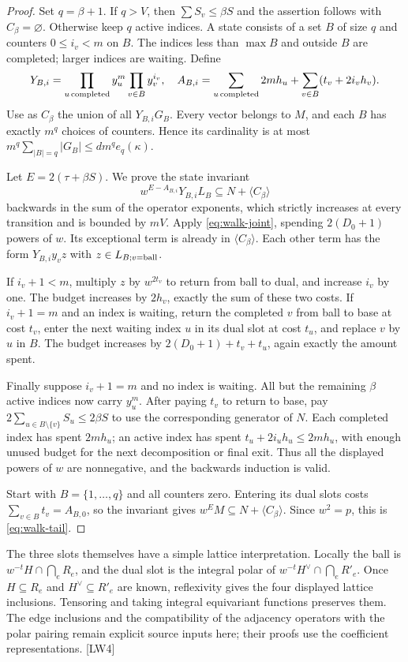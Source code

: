 \begin{proof}
Set $q=\beta+1$. If $q>V$, then $\sum S_v\le\beta S$ and the assertion follows with $C_\beta=\varnothing$. Otherwise keep $q$ active indices. A state consists of a set $B$ of size $q$ and counters $0\le i_v<m$ on $B$. The indices less than $\max B$ and outside $B$ are completed; larger indices are waiting. Define
\[
 Y_{B,i}=\prod_{u\,\rm completed}y_u^m\prod_{v\in B}y_v^{i_v},
 \quad
 A_{B,i}=\sum_{u\,\rm completed}2mh_u+
                 \sum_{v\in B}(t_v+2i_vh_v).
\]
Use as $C_\beta$ the union of all $Y_{B,i}G_B$. Every vector belongs to $M$, and each $B$ has exactly $m^q$ choices of counters. Hence its cardinality is at most
$m^q\sum_{|B|=q}|G_B|\le d m^q e_q(\kappa)$.

Let $E=2(\tau+\beta S)$. We prove the state invariant
\[
 w^{E-A_{B,i}}Y_{B,i}L_B\subseteq N+\langle C_\beta\rangle
\]
backwards in the sum of the operator exponents, which strictly increases at every transition and is bounded by $mV$. Apply \eqref{eq:walk-joint}, spending $2(D_0+1)$ powers of $w$. Its exceptional term is already in $\langle C_\beta\rangle$. Each other term has the form $Y_{B,i}y_vz$ with $z\in L_{B;v=\rm ball}$.

If $i_v+1<m$, multiply $z$ by $w^{2t_v}$ to return from ball to dual, and increase $i_v$ by one. The budget increases by $2h_v$, exactly the sum of these two costs. If $i_v+1=m$ and an index is waiting, return the completed $v$ from ball to base at cost $t_v$, enter the next waiting index $u$ in its dual slot at cost $t_u$, and replace $v$ by $u$ in $B$. The budget increases by
$2(D_0+1)+t_v+t_u$, again exactly the amount spent.

Finally suppose $i_v+1=m$ and no index is waiting. All but the remaining $\beta$ active indices now carry $y_u^m$. After paying $t_v$ to return to base, pay
$2\sum_{u\in B\setminus\{v\}}S_u\le2\beta S$ to use the corresponding generator of $N$. Each completed index has spent $2mh_u$; an active index has spent $t_u+2i_uh_u\le2mh_u$, with enough unused budget for the next decomposition or final exit. Thus all the displayed powers of $w$ are nonnegative, and the backwards induction is valid.

Start with $B=\{1,\ldots,q\}$ and all counters zero. Entering its dual slots costs $\sum_{v\in B}t_v=A_{B,0}$, so the invariant gives $w^EM\subseteq N+\langle C_\beta\rangle$. Since $w^2=p$, this is \eqref{eq:walk-tail}.
\end{proof}

The three slots themselves have a simple lattice interpretation. Locally the ball is
$w^{-t}H\cap\bigcap_eR_e$, and the dual slot is the integral polar of
$w^{-t}H^\vee\cap\bigcap_eR'_e$. Once $H\subseteq R_e$ and $H^\vee\subseteq R'_e$ are known, reflexivity gives the four displayed lattice inclusions. Tensoring and taking integral equivariant functions preserves them. The edge inclusions and the compatibility of the adjacency operators with the polar pairing remain explicit source inputs here; their proofs use the coefficient representations. \textsf{[LW4]}
